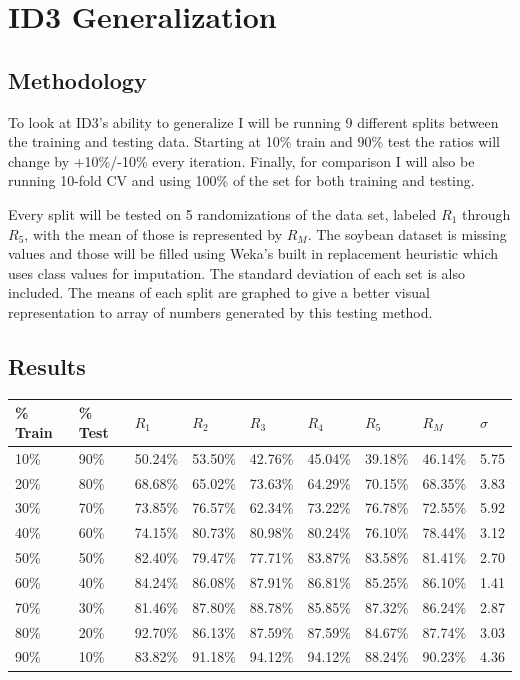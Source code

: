\documentclass[11pt, letterpaper]{report}
\begin{document}
\section{ID3 Generalization}

\subsection{Methodology}

To look at ID3's ability to generalize I will be running 9 different splits between the training and testing data. Starting at 10\% train and 90\% test the ratios will change by +10\%/-10\% every iteration. Finally, for comparison I will also be running 10-fold CV and using 100\% of the set for both training and testing.

Every split will be tested on 5 randomizations of the data set, labeled $R_{1}$ through $R_{5}$, with the mean of those is represented by $R_{M}$. The soybean dataset is missing values and those will be filled using Weka's built in replacement heuristic which uses class values for imputation. The standard deviation of each set is also included. The means of each split are graphed to give a better visual representation to array of numbers generated by this testing method.

\subsection{Results}

\begin{tabular}{ |l|l|l|l|l|l|l||l|l| }
    \hline
    \% Train & \% Test & $R_{1}$ & $R_{2}$ & $R_{3}$ & $R_{4}$ & $R_{5}$ & $R_{M}$ & $\sigma$ \\ \hline \hline
    10\% & 90\% & 50.24\% & 53.50\% & 42.76\% & 45.04\% & 39.18\% & 46.14\% & 5.75 \\ \hline
    20\% & 80\% & 68.68\% & 65.02\% & 73.63\% & 64.29\% & 70.15\% & 68.35\% & 3.83 \\ \hline
    30\% & 70\% & 73.85\% & 76.57\% & 62.34\% & 73.22\% & 76.78\% & 72.55\% & 5.92 \\ \hline
    40\% & 60\% & 74.15\% & 80.73\% & 80.98\% & 80.24\% & 76.10\% & 78.44\% & 3.12 \\ \hline
    50\% & 50\% & 82.40\% & 79.47\% & 77.71\% & 83.87\% & 83.58\% & 81.41\% & 2.70 \\ \hline
    60\% & 40\% & 84.24\% & 86.08\% & 87.91\% & 86.81\% & 85.25\% & 86.10\% & 1.41 \\ \hline
    70\% & 30\% & 81.46\% & 87.80\% & 88.78\% & 85.85\% & 87.32\% & 86.24\% & 2.87 \\ \hline
    80\% & 20\% & 92.70\% & 86.13\% & 87.59\% & 87.59\% & 84.67\% & 87.74\% & 3.03 \\ \hline
    90\% & 10\% & 83.82\% & 91.18\% & 94.12\% & 94.12\% & 88.24\% & 90.23\% & 4.36 \\ \hline
\end{tabular}
\end{document}
